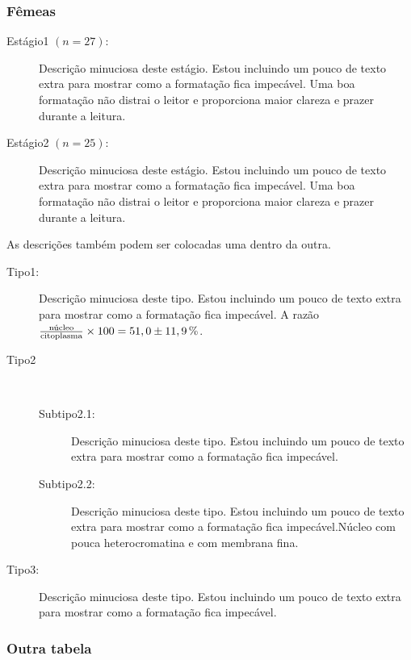\subsubsection{Fêmeas}\label{cap3:res:femeas}

\begin{description}
  \item[Estágio1 $(n=27)$:] Descrição minuciosa deste estágio.
    Estou incluindo um pouco de texto extra para mostrar como a formatação fica impecável.
    Uma boa formatação não distrai o leitor e proporciona maior clareza e prazer durante a leitura.
  \item[Estágio2 $(n=25)$:] Descrição minuciosa deste estágio.
    Estou incluindo um pouco de texto extra para mostrar como a formatação fica impecável.
    Uma boa formatação não distrai o leitor e proporciona maior clareza e prazer durante a leitura.
\end{description}

As descrições também podem ser colocadas uma dentro da outra.

\begin{description}
  \item[Tipo1:] Descrição minuciosa deste tipo.
    Estou incluindo um pouco de texto extra para mostrar como a formatação fica impecável.
    A razão $\frac{\text{núcleo}}{\text{citoplasma}}\times100=51,0\pm\unit[11,9]{\%}$.
  \item[Tipo2] ~
    \begin{description}
      \item[Subtipo2.1:] Descrição minuciosa deste tipo.
	Estou incluindo um pouco de texto extra para mostrar como a formatação fica impecável.
      \item[Subtipo2.2:] Descrição minuciosa deste tipo.
	Estou incluindo um pouco de texto extra para mostrar como a formatação fica impecável.Núcleo com pouca heterocromatina e com membrana fina.
    \end{description}
  \item[Tipo3:] Descrição minuciosa deste tipo.
	Estou incluindo um pouco de texto extra para mostrar como a formatação fica impecável.
\end{description}

\subsubsection{Outra tabela}\label{cap3:res:morf}

